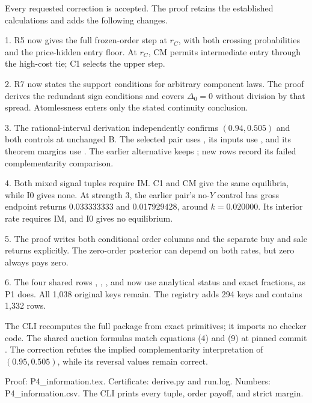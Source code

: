 \documentclass[11pt]{article}
\begin{document}
\par

Every requested correction is accepted. The proof retains the established calculations and adds the following changes.

\par 1. R5 now gives the full frozen-order step at $r_C$, with both crossing probabilities and the price-hidden entry floor.
   At $r_C$, CM permits intermediate entry through the high-cost tie; C1 selects the upper step.
\par 2. R7 now states the support conditions for arbitrary component laws.
   The proof derives the redundant sign conditions and covers $\Delta_0=0$ without division by that spread.
   Atomlessness enters only the stated continuity conclusion.
\par 3. The rational-interval derivation independently confirms $(0.94,0.505)$ and both controls at unchanged B.
   The selected pair uses , its inputs use , and its theorem margins use .
   The earlier alternative keeps ; new  rows record its failed complementarity comparison.
\par 4. Both mixed signal tuples require IM. C1 and CM give the same equilibria, while I0 gives none.
   At strength 3, the earlier pair's no-$Y$ control has gross endpoint returns 0.033333333 and 0.017929428, around $k=0.020000$.
   Its interior rate requires IM, and I0 gives no equilibrium.
\par 5. The proof writes both conditional order columns and the separate buy and sale returns explicitly.
   The zero-order posterior can depend on both rates, but zero always pays zero.
\par 6. The four shared rows , , , and  now use analytical status and exact fractions, as P1 does.
   All 1,038 original keys remain. The registry adds 294 keys and contains 1,332 rows.

The CLI recomputes the full package from exact primitives; it imports no checker code.
The shared auction formulas match equations (4) and (9) at pinned commit .
The correction refutes the implied complementarity interpretation of $(0.95,0.505)$, while its reversal values remain correct.

Proof: P4\_information.tex. Certificate: derive.py and run.log.
Numbers: P4\_information.csv. The CLI prints every tuple, order payoff, and strict margin.
\end{document}
